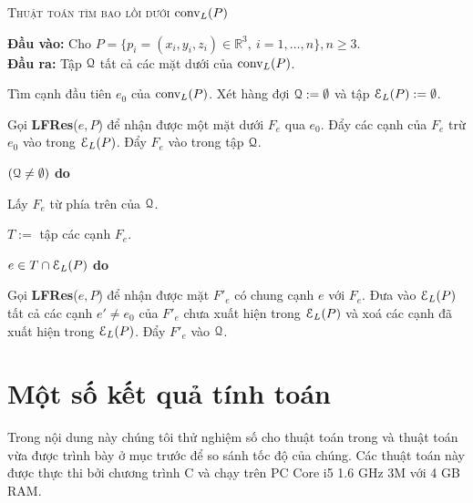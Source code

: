 \documentclass[12pt,a4paper,openany,oneside]{report}
\begin{document}
	{\fontsize{12pt}{12pt}\selectfont \baselineskip 0.65cm
	\renewcommand{\baselinestretch}{1.0}	
	\begin{algorithm}[ht!]
		
		\caption{\textsc{Thuật toán tìm bao lồi dưới} $\hbox{conv}_L(P)$}  \label{al-blduoi}
		\textbf{Đầu vào: }Cho $P=\{p_i=(x_i,y_i,z_i)\in \mathbb{R}^3,\ i=1,\dots,n\}, n\ge 3$.\\
		\textbf{Đầu ra:} Tập ${\cal Q}$ tất cả các mặt dưới của $\hbox{conv}_L(P)$.
		
		\begin{algorithmic}[1]
			
			
			\State Tìm cạnh đầu tiên $e_0$ của $\hbox{conv}_L(P)$. 
			\State Xét hàng đợi ${\cal Q}:=\emptyset$ và tập ${\cal E}_L(P):=\emptyset$.
			
			\State Gọi {\bf LFRes}($e, P$) để nhận được một mặt dưới $F_e$ qua $e_0$. Đẩy các cạnh của $F_e$  trừ $e_0$ vào trong ${\cal E}_L(P)$. Đẩy $F_e$ vào trong tập ${\cal Q}$.
			
			 $({\cal Q}\ne\emptyset)$ {\bf do}
			
			\State 
			\quad \quad Lấy $F_e$ từ phía trên của  ${\cal Q}$.
			
			\State 	\quad \quad \quad \quad $T:=$ tập các cạnh $F_e$.
			
			\State 	\quad \quad \quad {} $e \in T\cap  {\cal E}_L(P)$ {\bf do}
			
			\State 
			\quad \quad\quad \quad\quad \quad Gọi {\bf LFRes}($e, P$) để nhận được mặt $F'_e$ có chung cạnh $e$ với $F_e$. \hspace*{2.5cm}Đưa vào ${\cal E}_L(P)$ tất cả các cạnh $e' \ne e_0$ của $F'_e$ chưa xuất hiện trong \hspace*{2.5cm} ${\cal E}_L(P)$ và xoá các cạnh đã xuất hiện trong ${\cal E}_L(P)$. Đẩy $F'_e$ vào ${\cal Q}$.
		
			
		\end{algorithmic}
	\end{algorithm}
}

	\chapter{Một số kết quả tính toán }
Trong nội dung này chúng tôi thử nghiệm số cho thuật toán trong \cite{An-Giang} và thuật toán vừa được trình bày ở mục trước để so sánh tốc độ của chúng. Các thuật toán này được thực thi bởi chương trình C và chạy trên PC Core i5 1.6 GHz 3M với 4 GB RAM.  
\end{document}
